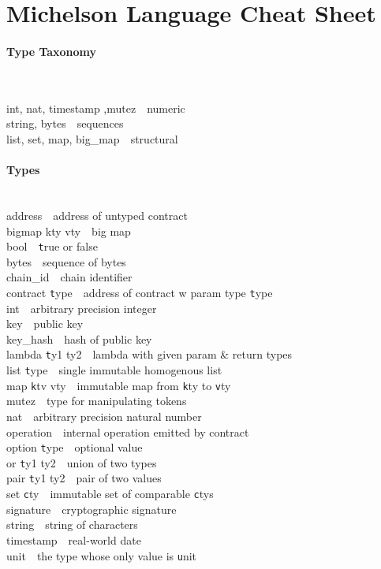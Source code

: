 \documentclass[10pt]{article}
\newcommand{\command}[2]{#1~\dotfill{}~#2\\} %
\newcommand{\sectiontitle}[1]{\paragraph{#1} \ \\} %
\begin{document}
\section*{Michelson Language Cheat Sheet} %
\begin{multicols}{3}
  \sectiontitle{Type Taxonomy}
  \noindent
  \begin{flushright}
    \command{int, nat, timestamp ,mutez}{numeric}
    \command{string, bytes}{sequences}
    \command{list, set, map, big\_map}{structural}

  \end{flushright}
  \sectiontitle{Types}
  \noindent
  \command{address}{address of untyped contract}
  \command{bigmap kty vty}{big map}
  \command{bool}{{\texttt true} or false}
  \command{bytes}{sequence of bytes}
  \command{chain\_id}{chain identifier}
  \command{contract {\texttt type}}{address of contract w param type {\texttt type}}
  \command{int}{arbitrary precision integer}
  \command{key}{public key}
  \command{key\_hash}{hash of public key}
  \command{lambda {\texttt ty1 ty2}}{lambda with given param \& return types}
  \command{list {\texttt type}}{single immutable homogenous list}
  \command{map {\texttt ktv vty}}{immutable map from {\texttt kty} to {\texttt vty}}
  \command{mutez}{type for manipulating tokens}
  \command{nat}{arbitrary precision natural number}
  \command{operation}{internal operation emitted by contract}
  \command{option {\texttt type}}{optional value}
  \command{or {\texttt ty1 ty2}}{union of two types}
  \command{pair {\texttt ty1 ty2}}{pair of two values}
  \command{set {\texttt cty}}{immutable set of comparable {\texttt cty}s}
  \command{signature}{cryptographic signature}
  \command{string}{string of characters}
  \command{timestamp}{real-world date}
  \command{unit}{the type whose only value is {\texttt unit}}



\end{multicols}
\end{document}

